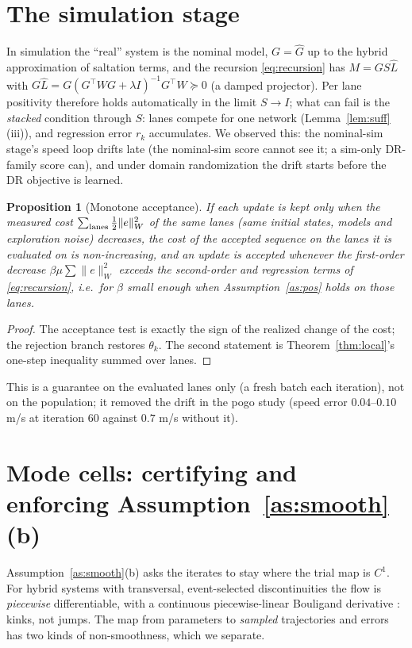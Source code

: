 \documentclass[11pt]{article}
\newtheorem{proposition}[theorem]{Proposition}
\theoremstyle{definition}
\theoremstyle{remark}
\newcommand{\nW}[1]{\lVert #1\rVert_W}
\newcommand{\Ghat}{\widehat G}
\newcommand{\Lhat}{\widehat L}
\begin{document}
\section{The simulation stage}\label{sec:sim}
In simulation the ``real'' system is the nominal model, $G=\Ghat$ up to the hybrid approximation of saltation terms, and
the recursion \eqref{eq:recursion} has $M=GS\Lhat$ with $G\Lhat=G(G^\top WG+\lambda I)^{-1}G^\top W\succeq0$ (a
damped projector). Per lane positivity therefore holds automatically in the limit $S\to I$; what can fail is the
\emph{stacked} condition through $S$: lanes compete for one network (Lemma~\ref{lem:suff}(iii)), and regression error
$r_k$ accumulates. We observed this: the nominal-sim stage's speed loop drifts late (the nominal-sim score cannot see
it; a sim-only DR-family score can), and under domain randomization the drift starts before the DR objective is learned.
\begin{proposition}[Monotone acceptance]\label{prop:accept}
If each update is kept only when the measured cost $\sum_{\rm lanes}\tfrac12\nW{e}^2$ of the same lanes (same initial
states, models and exploration noise) decreases, the cost of the accepted sequence on the lanes it is evaluated on is
non-increasing, and an update is accepted whenever the first-order decrease
$\beta\mu\sum\nW{e}^2$ exceeds the second-order and regression terms of \eqref{eq:recursion}, i.e.\ for
$\beta$ small enough when Assumption~\ref{as:pos} holds on those lanes.
\end{proposition}
\begin{proof}
The acceptance test is exactly the sign of the realized change of the cost; the rejection branch restores $\theta_k$.
The second statement is Theorem~\ref{thm:local}'s one-step inequality summed over lanes.
\end{proof}
This is a guarantee on the evaluated lanes only (a fresh batch each iteration), not on the population; it removed the
drift in the pogo study (speed error $0.04$--$0.10$ m/s at iteration 60 against $0.7$ m/s without it).

\section{Mode cells: certifying and enforcing Assumption~\ref{as:smooth}(b)}\label{sec:modes}
Assumption~\ref{as:smooth}(b) asks the iterates to stay where the trial map is $C^1$. For hybrid systems with
transversal, event-selected discontinuities the flow is \emph{piecewise} differentiable, with a continuous
piecewise-linear Bouligand derivative \cite{burden2016pwd}: kinks, not jumps. The map from parameters to
\emph{sampled} trajectories and errors has two kinds of non-smoothness, which we separate.
\end{document}
